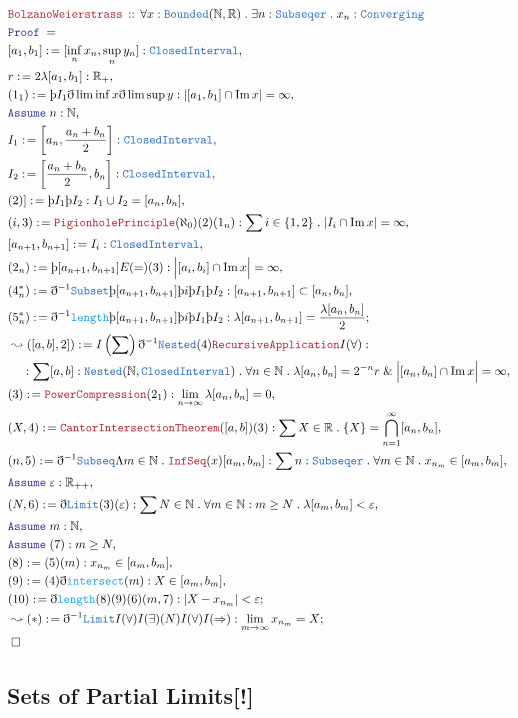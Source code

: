 \documentclass[12pt]{scrartcl}
\newcommand{\TYPE}[1]{\textcolor{NavyBlue}{\mathtt{#1}}}
\newcommand{\FUNC}[1]{\textcolor{Cerulean}{\mathtt{#1}}}
\newcommand{\LOGIC}[1]{\textcolor{Blue}{\mathtt{#1}}}
\newcommand{\THM}[1]{\textcolor{Maroon}{\mathtt{#1}}}
\renewcommand{\.}{\; . \;}
\newcommand{\de}{: \kern 0.1pc =}
\newcommand{\Theorem}[2]{& \THM{#1} \, :: \, #2 \\ & \Proof = \\ }
\newcommand{\NewLine}{\\ & \kern 1pc}
\newcommand{\Page}[1]{ \begin{align*} #1 \end{align*}   }
\newcommand{ \bd }{ \ByDef }
\renewcommand{\And}{\; \& \;}
\newcommand{\Reals}{\mathbb{R} }
\newcommand{\Nat}{\mathbb{N} }
\DeclareMathOperator*{\im}{Im}
\newcommand{\Say}[3]{& #1 \de #2 : #3, \\}
\newcommand{\Conclude}[3]{& #1 \de #2 : #3; \\}
\newcommand{\Derive}[3]{& \leadsto #1 \de #2 : #3, \\}
\newcommand{\DeriveConclude}[3]{& \leadsto #1 \de #2 : #3 ; \\}
\newcommand{\Assume}[2]{& \LOGIC{Assume} \;#1 : #2, \\}
\newcommand{\QED}{\; \square}
\newcommand{\EndProof}{& \QED \\}
\newcommand{\ByDef}{\eth}
\newcommand{\ByConstr}{\text{\thorn}}
\newcommand{\Proof}{\LOGIC{Proof} \; }
\begin{document}
\Page{
	\Theorem{BolzanoWeierstrass}{ \forall x : \TYPE{Bounded}(\Nat,\Reals) \.   
		\exists n : \TYPE{Subseqer} \. x_n : \TYPE{Converging}
	}
	\Say{[a_1,b_1]}{[ \inf_n x_n, \sup_n y_n ]}{\TYPE{ClosedInterval}}
	\Say{r}{ 2\lambda [a_1,b_1] }{\Reals_+}
	\Say{(1_1)}{\ByConstr I_1 \bd \lim \inf x \bd \lim \sup y}{ | [a_1,b_1] \cap \im x | = \infty }
	\Assume{n}{\Nat}
	\Say{I_1}{\left[a_n, \frac{a_n + b_n}{2}\right]}{\TYPE{ClosedInterval}}
	\Say{I_2}{\left[\frac{a_n + b_n}{2}, b_n \right]}{\TYPE{ClosedInterval}}
	\Say{(2)]}{\ByConstr I_1 \ByConstr I_2}{ I_1 \cup I_2 = [a_n,b_n]}
	\Say{(i,3)}{\THM{PigionholePrinciple}(\aleph_0)(2)(1_n)}{\sum i \in \{1,2\} \. |I_i  \cap \im x| = \infty}
	\Say{[a_{n+1},b_{n+1}]}{I_i}{\TYPE{ClosedInterval}}
	\Say{(2_n)}{\ByConstr [a_{n+1},b_{n+1}]E(=)(3)}{ \Big| [a_i,b_i] \cap \im x \Big| = \infty}
	\Say{(4^*_n)}{  \bd^{-1} \TYPE{Subset} \ByConstr [a_{n + 1},b_{n+1}] \ByConstr i \ByConstr I_1 \ByConstr I_2  }
		{ [a_{n + 1}, b_{n+1}] \subset [a_n,b_n] }
	\Conclude{(5^*_n)}{\bd^{-1} \FUNC{length} \ByConstr [a_{n + 1},b_{n+1}] \ByConstr i \ByConstr I_1 \ByConstr I_2 }
		{ \lambda [a_{n+1},b_{n+1}] = \frac{\lambda [a_{n},b_{n}]}{2}  }
	\Derive{([a,b],2])}{I\left(\sum \right)\bd^{-1}\TYPE{Nested}(4)\THM{RecursiveApplication} I(\forall)}
	{ \NewLine : \sum [a,b] : \TYPE{Nested}(\Nat,\TYPE{ClosedInterval}) \. \forall n \in \Nat \. 
		\lambda [a_n,b_n] = 2^{-n} r  \And   \Big| [a_n,b_n] \cap \im x    \Big| = \infty  }
	\Say{(3)}{\THM{PowerCompression}(2_1)}{\lim_{n \to \infty} \lambda [a_n,b_n] = 0}
	\Say{ (X,4)  }{\THM{CantorIntersectionTheorem}([a,b])(3)}{\sum X \in \Reals \. \{X\} = \bigcap^\infty_{n=1} [a_n,b_n] }
	\Say{(n,5) }{ \bd^{-1} \TYPE{Subseq} \Lambda m \in \Nat \.  \THM{InfSeq}(x)[a_m,b_m] }
	{  \sum n : \TYPE{Subseqer} \. \forall m \in \Nat \. x_{n_m} \in [a_m,b_m] }
	\Assume{\varepsilon}{\Reals_{++}}
	\Say{(N,6)}{ \bd \TYPE{Limit}(3)(\varepsilon)  }
	{\sum N \in \Nat \. \forall m \in \Nat : m \ge N \. \lambda[a_m,b_m] < \varepsilon}
	\Assume{m}{\Nat}
	\Assume{(7)}{m \ge N}
	\Say{(8)}{(5)(m)}{ x_{n_m} \in [a_m,b_m]}
	\Say{(9)}{(4)\bd\FUNC{intersect}(m)}{X \in [a_m,b_m] }
	\Conclude{(10)}{\bd \FUNC{length}(8)(9)(6)(m,7)}{ | X  - x_{n_m}| < \varepsilon }
	\DeriveConclude{(*)}{\bd^{-1} \TYPE{Limit}I(\forall)I(\exists)(N)I(\forall)I(\Rightarrow)}
	{  \lim_{m \to \infty} x_{n_m} = X      }
	\EndProof
}
\newpage
\subsection{Sets of Partial Limits[!]}
\newpage
\end{document}
